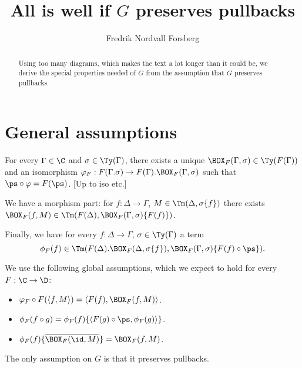 \documentclass{article}
\title{All is well if $G$ preserves pullbacks}
\author{Fredrik Nordvall Forsberg}
\newcommand{\isoFL}{\ensuremath{\phi_{F}}}
\begin{document}
\maketitle

\begin{abstract}
  Using too many diagrams, which makes the text a lot longer than it
  could be, we derive the special properties needed of $G$ from the
  assumption that $G$ preserves pullbacks.
\end{abstract}

\section{General assumptions}

For every $\Gamma \in \C$ and $\sigma \in \Ty(\Gamma)$, there exists a
unique $\BOX_F(\Gamma, \sigma) \in \Ty(F(\Gamma))$ and an isomorphism
$\varphi_F : F(\Gamma.\sigma) \to F(\Gamma).\BOX_F(\Gamma, \sigma)$
such that $\ps \circ \varphi = F(\ps)$. [Up to iso etc.]

We have a morphism part: for $f : \Delta \to \Gamma$, $M \in
\Tm(\Delta, \sigma\{f\})$ there exists $\BOX_F(f, M) \in \Tm(F(\Delta),
\BOX_F(\Gamma, \sigma)\{F(f)\})$.

Finally, we have for every
$f : \Delta \to \Gamma$, $\sigma \in
\Ty(\Gamma)$ a term
\[\isoFL(f) \in \Tm(F(\Delta).\BOX_F(\Delta,
\sigma\{f\}), \BOX_F(\Gamma, \sigma)\{F(f) \circ \ps\}).\]

We use the following global assumptions, which we expect to hold for
every $F : \C \to \D$:

\begin{itemize}
\item $\varphi_F \circ F(\langle f , M\rangle) = \langle F(f), \BOX_F(f, M)\rangle$.
\item $\isoFL(f \circ g) = \isoFL(f)\{\langle F(g) \circ \ps, \isoFL(g)\rangle\}$.
\item $\isoFL(f)\{\overline{\BOX_F(\id, M)}\} = \BOX_F(f, M)$.
\end{itemize}

The only assumption on $G$ is that it preserves pullbacks.
\end{document}

